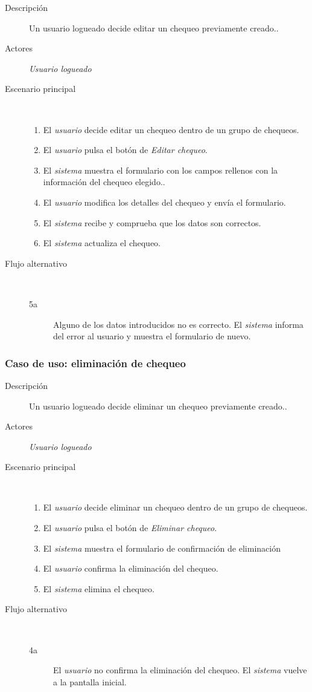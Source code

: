 \begin{description}
\item[Descripción] Un usuario logueado decide editar un chequeo previamente creado..
\item[Actores] \textit{Usuario logueado}
\item[Escenario principal] $\quad$
  \begin{enumerate}
  \item El \textit{usuario} decide editar un chequeo dentro de un grupo de chequeos.
  \item El \textit{usuario} pulsa el botón de \textit{Editar chequeo}.
  \item El \textit{sistema} muestra el formulario con los campos rellenos con la información del chequeo elegido..
  \item El \textit{usuario} modifica los detalles del chequeo y envía el formulario.
  \item El \textit{sistema} recibe y comprueba que los datos son correctos.
  \item El \textit{sistema} actualiza el chequeo.
  \end{enumerate}
\item[Flujo alternativo] $\quad$
  \begin{description}
  \item[5a] Alguno de los datos introducidos no es correcto. El \textit{sistema}
    informa del error al usuario y muestra el formulario de nuevo.
  \end{description}
\end{description}

\subsubsection{Caso de uso: eliminación de chequeo}

\begin{description}
\item[Descripción] Un usuario logueado decide eliminar un chequeo previamente creado..
\item[Actores] \textit{Usuario logueado}
\item[Escenario principal] $\quad$
  \begin{enumerate}
  \item El \textit{usuario} decide eliminar un chequeo dentro de un grupo de chequeos.
  \item El \textit{usuario} pulsa el botón de \textit{Eliminar chequeo}.
  \item El \textit{sistema} muestra el formulario de confirmación de eliminación
  \item El \textit{usuario} confirma la eliminación del chequeo.
  \item El \textit{sistema} elimina el chequeo.
  \end{enumerate}
\item[Flujo alternativo] $\quad$
  \begin{description}
  \item[4a] El \textit{usuario} no confirma la eliminación del chequeo. El
    \textit{sistema} vuelve a la pantalla inicial.
  \end{description}
\end{description}

